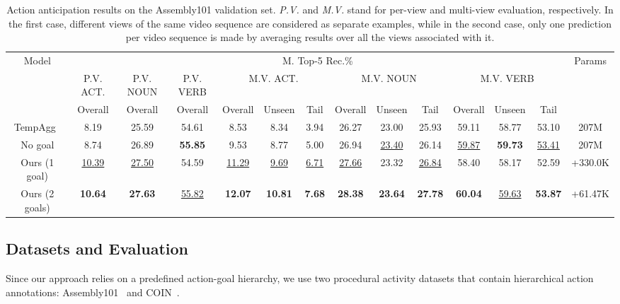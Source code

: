 \documentclass{article}
\begin{document}
\begin{table*}[t!]
\centering
\scriptsize
\begin{tabular}{|c|c|c|c||c|c|c|c|c|c|c|c|c|c|}
    \hline
    \multirow{3}{*}{Model}& \multicolumn{12}{c|}{M. Top-5 Rec.\%} & \multirow{3}{*}{Params} \\
    \cline{2-13}
    & P.V. ACT. & P.V. NOUN & P.V. VERB & \multicolumn{3}{c|}{M.V. ACT.} & \multicolumn{3}{c|}{M.V. NOUN} & \multicolumn{3}{c|}{M.V. VERB} & \\
    \cline{2-13}
    & Overall & Overall & Overall & Overall & Unseen & Tail & Overall & Unseen & Tail & Overall & Unseen & Tail &  \\
    \hline
    \hline
    TempAgg~\cite{sener2022assembly101} & 8.19 & 25.59 & 54.61 & 8.53 & 8.34 & 3.94 & 26.27 & 23.00 & 25.93 & 59.11 & 58.77 & 53.10 & 207M \\
    \hline
    \hline
    No goal & 8.74 & 26.89 & \textbf{55.85} & 9.53 & 8.77 & 5.00 & 26.94 & \underline{23.40} & 26.14 & \underline{59.87} & \textbf{59.73} & \underline{53.41} & 207M \\
    \hline
    Ours (1 goal) & \underline{10.39} & \underline{27.50} & 54.59 & \underline{11.29} & \underline{9.69} & \underline{6.71} & \underline{27.66} & 23.32 & \underline{26.84} & 58.40 & 58.17 & 52.59 & +330.0K \\ 
    \hline
    Ours (2 goals) & \textbf{10.64} & \textbf{27.63} & \underline{55.82} & \textbf{12.07} & \textbf{10.81} & \textbf{7.68} & \textbf{28.38 }& \textbf{23.64} & \textbf{27.78} & \textbf{60.04} & \underline{59.63} & \textbf{53.87} & +61.47K \\
    \hline
\end{tabular}
\caption{\small Action anticipation results on the Assembly101 validation set. \textit{P.V.} and \textit{M.V.} stand for per-view and multi-view evaluation, respectively. In the first case, different views of the same video sequence are considered as separate examples, while in the second case, only one prediction per video sequence is made by averaging results over all the views associated with it.}
\label{tab:res_assembly}
\end{table*}


\vspace{-0.25cm}
\subsection{Datasets and Evaluation}
\vspace{-0.1cm}
Since our approach relies on a predefined action-goal hierarchy,  we use two procedural activity datasets that contain hierarchical action annotations: Assembly101~\cite{sener2022assembly101} and COIN~\cite{tang2019coin}. 
\end{document}
